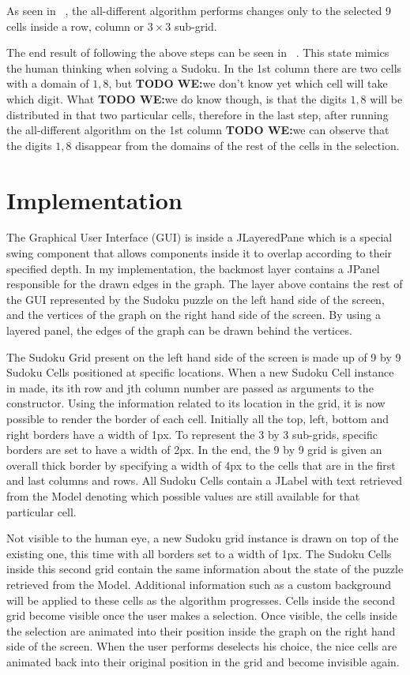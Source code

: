 \documentclass{l4proj}
\begin{document}
\noindent As seen in ~, the all-different algorithm performs changes only to the selected 9 cells  inside a row, column or $3\times 3$ sub-grid. 

\noindent The end result of following the above steps can be seen in ~. This state mimics the human thinking when solving a Sudoku. In the 1st column there are two cells with a domain of ${1, 8}$, but \textbf{TODO WE:}we don't know yet which cell will take which digit. What \textbf{TODO WE:}we do know though, is that the digits ${1, 8}$ will be distributed in that two particular cells, therefore in the last step, after running the all-different algorithm on the 1st column \textbf{TODO WE:}we can observe that the digits ${1, 8}$ disappear from the domains of the rest of the cells in the selection.

 
\chapter{Implementation}
\label{chap6implementation}

\noindent The Graphical User Interface (GUI) is inside a JLayeredPane which is a special swing component that allows components inside it to overlap according to their specified depth. In my implementation, the backmost layer contains a JPanel responsible for the drawn edges in the graph. The layer above contains the rest of the GUI represented by the Sudoku puzzle on the left hand side of the screen, and the vertices of the graph on the right hand side of the screen. By using a layered panel, the edges of the graph can be drawn behind the vertices.

\noindent The Sudoku Grid present on the left hand side of the screen is made up of 9 by 9 Sudoku Cells positioned at specific locations. When a new Sudoku Cell instance in made, its ith row and jth column number are passed as arguments to the constructor. Using the information related to its location in the grid, it is now possible to render the border of each cell. Initially all the top, left, bottom and right borders have a width of 1px. To represent the 3 by 3 sub-grids, specific borders are set to have a width of 2px. In the end, the 9 by 9 grid is given an overall thick border by specifying a width of 4px to the cells that are in the first and last columns and rows. All Sudoku Cells contain a JLabel with text retrieved from the Model denoting which possible values are still available for that particular cell.

\noindent Not visible to the human eye, a new Sudoku grid instance is drawn on top of the existing one, this time with all borders set to a width of 1px. The Sudoku Cells inside this second grid contain the same information about the state of the puzzle retrieved from the Model. Additional information such as a custom background will be applied to these cells as the algorithm progresses. Cells inside the second grid become visible once the user makes a selection. Once visible, the cells inside the selection are animated into their position inside the graph on the right hand side of the screen. When the user performs deselects his choice, the nice cells are animated back into their original position in the grid and become invisible again.
 
\end{document}
